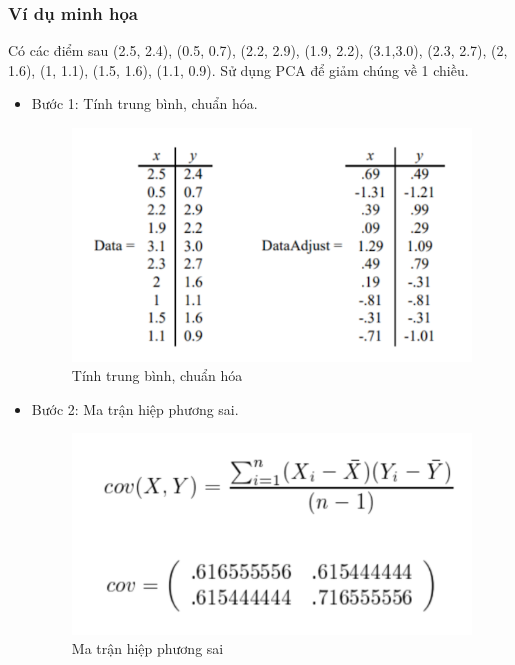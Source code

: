 \documentclass[a4paper, 12pt]{article}
\begin{document}
\subsubsection{Ví dụ minh họa}
Có các điểm sau (2.5, 2.4), (0.5, 0.7), (2.2, 2.9), (1.9, 2.2), (3.1,3.0), (2.3, 2.7), (2, 1.6), (1, 1.1), (1.5, 1.6), (1.1, 0.9). Sử dụng PCA để giảm chúng về 1 chiều.
\begin{itemize}
    \item Bước 1: Tính trung bình, chuẩn hóa.
    \begin{figure}[H]
        \begin{center}
            \includegraphics[scale=0.5]{img/PCA-cal-1}
            \caption{Tính trung bình, chuẩn hóa}
        \end{center}
    \end{figure}

    \item Bước 2: Ma trận hiệp phương sai.
    \begin{figure}[H]
        \begin{center}
            \includegraphics[scale=0.5]{img/PCA-cal-2}
            \caption{Ma trận hiệp phương sai}
        \end{center}
    \end{figure}
    

\end{itemize}
\end{document}

